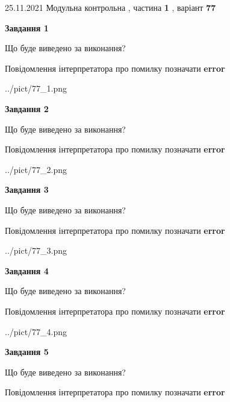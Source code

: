 \documentclass[10pt, ukrainian]{article}
\begin{document}
{25.11.2021 Модульна контрольна , частина \textbf { 1 }, варіант  \No \textbf { 77 }\par}
{
\begin {large}

{\begin {center}\textbf{Завдання 1}\end {center}}\par
Що буде виведено за виконання? \par
Повідомлення інтерпретатора про помилку позначати \textbf{error}

\begin{center}
	{../pict/77_1.png}
\end{center}
\newpage

{\begin {center}\textbf{Завдання 2}\end {center}}\par
Що буде виведено за виконання? \par
Повідомлення інтерпретатора про помилку позначати \textbf{error}

\begin{center}
	{../pict/77_2.png}
\end{center}
\newpage

{\begin {center}\textbf{Завдання 3}\end {center}}\par
Що буде виведено за виконання? \par
Повідомлення інтерпретатора про помилку позначати \textbf{error}

\begin{center}
	{../pict/77_3.png}
\end{center}
\newpage

{\begin {center}\textbf{Завдання 4}\end {center}}\par
Що буде виведено за виконання? \par
Повідомлення інтерпретатора про помилку позначати \textbf{error}

\begin{center}
	{../pict/77_4.png}
\end{center}
\newpage

{\begin {center}\textbf{Завдання 5}\end {center}}\par
Що буде виведено за виконання? \par
Повідомлення інтерпретатора про помилку позначати \textbf{error}


\end{large}}
\end{document}
